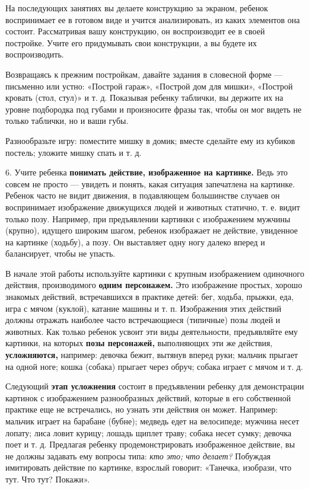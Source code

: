 \documentclass{book}
\renewcommand{\emph}[1]{\textit{#1}}
\begin{document}
На последующих занятиях вы делаете конструкцию за экраном, ребенок
воспринимает ее в готовом виде и учится анализировать, из каких
элементов она состоит. Рассматривая вашу конструкцию, он воспроизводит
ее в своей постройке. Учите его придумывать свои конструкции, а вы
будете их воспроизводить.

Возвращаясь к прежним постройкам, давайте задания в словесной форме ---
письменно или устно: «Построй гараж», «Построй дом для мишки», «Построй
кровать (стол, стул)» и т. д. Показывая ребенку таблички, вы держите их
на уровне подбородка под губами и произносите фразы так, чтобы он мог
видеть не только таблички, но и ваши губы.

Разнообразьте игру: поместите мишку в домик; вместе сделайте ему из
кубиков постель; уложите мишку спать и т. д.

6. Учите ребенка \textbf{понимать действие, изображенное на картинке.}
Ведь это совсем не просто --- увидеть и понять, какая ситуация
запечатлена на картинке. Ребенок часто не видит движения, в подавляющем
большинстве случаев он воспринимает изображение движущихся людей и
животных статично, т. е. видит только позу. Например, при предъявлении
картинки с изображением мужчины (крупно), идущего широким шагом, ребенок
изображает не действие, увиденное на картинке (ходьбу), а позу. Он
выставляет одну ногу далеко вперед и балансирует, чтобы не упасть.

В начале этой работы используйте картинки с крупным изображением
одиночного действия, производимого \textbf{одним персонажем.} Это
изображение простых, хорошо знакомых действий, встречавшихся в практике
детей: бег, ходьба, прыжки, еда, игра с мячом (куклой), катание машины и
т. п. Изображения этих действий должны отражать наиболее часто
встречающиеся (типичные) позы людей и животных. Как только ребенок
усвоит эти виды деятельности, предъявляйте ему картинки, на которых
\textbf{позы персонажей,} выполняющих эти же действия,
\textbf{усложняются,} например: девочка бежит, вытянув вперед руки;
мальчик прыгает на одной ноге; кошка (собака) прыгает через обруч;
собака играет с мячом и т. д.

Следующий \textbf{этап усложнения} состоит в предъявлении ребенку для
демонстрации картинок с изображением разнообразных действий, которые в
его собственной практике еще не встречались, но узнать эти действия он
может. Например: мальчик играет на барабане (бубне); медведь едет на
велосипеде; мужчина несет лопату; лиса ловит курицу; лошадь щиплет
траву; собака несет сумку; девочка поет и т. д. Предлагая ребенку
продемонстрировать изображенное действие, вы не должны задавать ему
вопросы типа: \emph{кто это; что делает?} Побуждая имитировать действие
по картинке, взрослый говорит: «Танечка, изобрази, что тут. Что тут?
Покажи».
\end{document}
